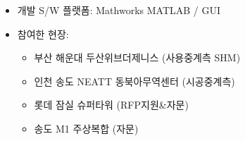 \documentclass[10pt,a4paper,ragged2e]{altacv}
\begin{document}
\begin{fullwidth}
\begin{itemize}
\begin{itemize}
  \end{itemize}
\item 개발 S/W 플랫폼: Mathworks MATLAB / GUI
\item 참여한 현장:
\begin{itemize}
  \item 부산 해운대 두산위브더제니스 (사용중계측 SHM)
  \item 인천 송도 NEATT 동북아무역센터 (시공중계측)
  \item 롯데 잠실 슈퍼타워 (RFP지원\&자문)
  \item 송도 M1 주상복합 (자문)
\end{itemize}
\end{itemize}

\divider



\end{fullwidth}
\end{document}
